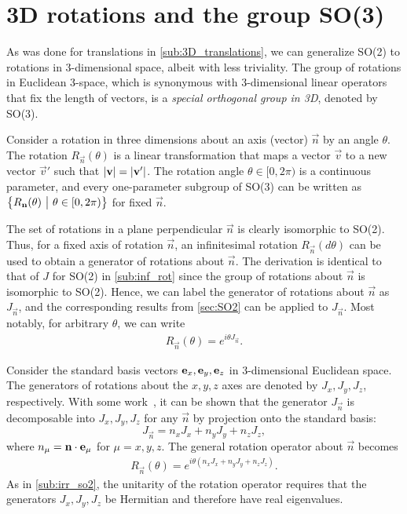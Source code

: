 \section{3D rotations and the group SO(3)}\label{sec:SO3}
As was done for translations in \cref{sub:3D_translations}, we can generalize SO(2) to rotations in 3-dimensional space, albeit with less triviality. The group of rotations in Euclidean 3-space, which is synonymous with 3-dimensional linear operators that fix the length of vectors, is a \textit{special orthogonal group in 3D}, denoted by SO(3).

Consider a rotation in three dimensions about an axis (vector) $\vec{n}$ by an angle $\theta$. The rotation $R_{\vec{n}}(\theta)$ is a linear transformation that maps a vector $\vec{v}$ to a new vector $\vec{v}'$ such that $\left|\mathbf{v}\right|=\left|\mathbf{v}'\right|$. The rotation angle $\theta\in[0,2\pi)$ is a continuous parameter, and every one-parameter subgroup of SO(3) can be written as $\left\{ R_{\mathbf{n}}(\theta) ~\big|~ \theta\in[0,2\pi) \right\}$ for fixed $\vec{n}$.

The set of rotations in a plane perpendicular $\vec{n}$ is clearly isomorphic to SO(2). Thus, for a fixed axis of rotation $\vec{n}$, an infinitesimal rotation $R_{\vec{n}}(d\theta)$ can be used to obtain a generator of rotations about $\vec{n}$. The derivation is identical to that of $J$ for SO(2) in \cref{sub:inf_rot} since the group of rotations about $\vec{n}$ is isomorphic to SO(2). Hence, we can label the generator of rotations about $\vec{n}$ as $J_{\vec{n}}$, and the corresponding results from \cref{sec:SO2} can be applied to $J_{\vec{n}}$. Most notably, for arbitrary $\theta$, we can write
\begin{align*}
    R_{\vec{n}}(\theta) = e^{i\theta J_{\vec{n}}}.
\end{align*}

Consider the standard basis vectors $\mathbf{e}_x,\mathbf{e}_y,\mathbf{e}_z$ in 3-dimensional Euclidean space. The generators of rotations about the $x,y,z$ axes are denoted by $J_x,J_y,J_z$, respectively. With some work~\cite{Tung1985}, it can be shown that the generator $J_{\vec{n}}$ is decomposable into $J_x,J_y,J_z$ for any $\vec{n}$ by projection onto the standard basis:
\begin{equation}
    J_{\vec{n}} = n_x J_x + n_y J_y + n_z J_z,
\end{equation}
where $n_\mu = \mathbf{n}\cdot\mathbf{e}_\mu$ for $\mu=x,y,z$.
The general rotation operator about $\vec{n}$ becomes
\begin{align*}
    R_{\vec{n}}(\theta) = e^{i\theta(n_x J_x + n_y J_y + n_z J_z)}.
\end{align*}
As in \cref{sub:irr_so2}, the unitarity of the rotation operator requires that the generators $J_x,J_y,J_z$ be Hermitian and therefore have real eigenvalues.

